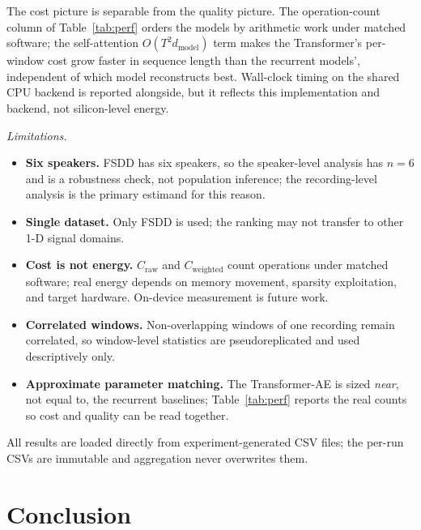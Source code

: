 \documentclass[conference]{IEEEtran}
\begin{document}
\par The cost picture is separable from the quality picture. The
operation-count column of Table~\ref{tab:perf} orders the models by arithmetic
work under matched software; the self-attention $O(T^2 d_{\mathrm{model}})$ term
makes the Transformer's per-window cost grow faster in sequence length than the
recurrent models', independent of which model reconstructs best. Wall-clock
timing on the shared CPU backend is reported alongside, but it reflects this
implementation and backend, not silicon-level energy.

\emph{Limitations.}
\begin{itemize}
  \item \textbf{Six speakers.} FSDD has six speakers, so the speaker-level
        analysis has $n=6$ and is a robustness check, not population inference;
        the recording-level analysis is the primary estimand for this reason.
  \item \textbf{Single dataset.} Only FSDD is used; the ranking may not transfer
        to other 1-D signal domains.
  \item \textbf{Cost is not energy.} $C_{\mathrm{raw}}$ and $C_{\mathrm{weighted}}$
        count operations under matched software; real energy depends on memory
        movement, sparsity exploitation, and target hardware. On-device
        measurement is future work.
  \item \textbf{Correlated windows.} Non-overlapping windows of one recording
        remain correlated, so window-level statistics are pseudoreplicated and
        used descriptively only.
  \item \textbf{Approximate parameter matching.} The Transformer-AE is sized
        \emph{near}, not equal to, the recurrent baselines; Table~\ref{tab:perf}
        reports the real counts so cost and quality can be read together.
\end{itemize}

\par All results are loaded directly from experiment-generated CSV files; the
per-run CSVs are immutable and aggregation never overwrites them.

\section{Conclusion}
\label{sec:conclusion}
\end{document}
